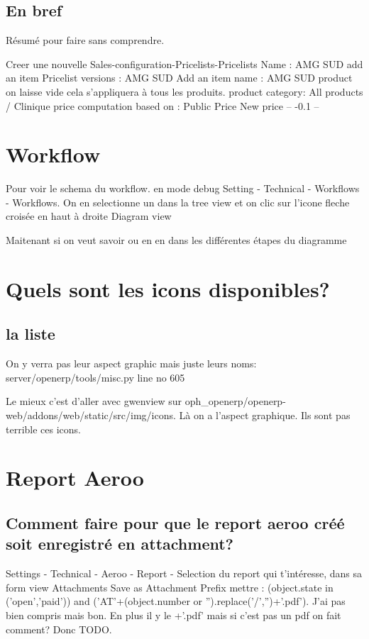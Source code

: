 \documentclass[12pt,a4paper]{article}
\begin{document}
\subsection{En bref}
\label{sec:bref}

Résumé pour faire sans comprendre.

Creer une nouvelle Sales-configuration-Pricelists-Pricelists 
Name : AMG SUD
add an item
Pricelist versions : AMG SUD 
Add an item 
name : AMG SUD
product on laisse vide cela s'appliquera à tous les produits.
product category: All products / Clinique
price computation
based on : Public Price
New price -- -0.1 --
\section{Workflow}
\label{sec:workflow}


Pour voir le schema du workflow.
en mode debug
Setting - Technical - Workflows - Workflows.
On en selectionne un dans la tree view et on clic sur l'icone fleche croisée en haut à droite
Diagram view

Maitenant si on veut savoir ou en en dans les différentes étapes du diagramme

\section{Quels sont les icons disponibles?}
\label{sec:icons}

\subsection{la liste}
\label{sec:list}

On y verra pas leur aspect graphic mais juste leurs noms:
server/openerp/tools/misc.py line no 605

Le mieux c'est d'aller avec gwenview sur oph\_openerp/openerp-web/addons/web/static/src/img/icons. Là on a l'aspect graphique. Ils sont pas terrible ces icons.

\section{Report Aeroo}
\label{sec:aeroo_report}


\subsection{Comment faire pour que le report aeroo créé soit enregistré en attachment?}
\label{sec:report2attachment}
Settings - Technical - Aeroo - Report - Selection du report qui t'intéresse, dans sa form view Attachments Save as Attachment Prefix mettre : (object.state in ('open','paid')) and ('AT'+(object.number or '').replace('/','')+'.pdf'). J'ai pas bien compris mais bon. En plus il y le +'.pdf' mais si c'est pas un pdf on fait comment? Donc TODO.
\end{document}
